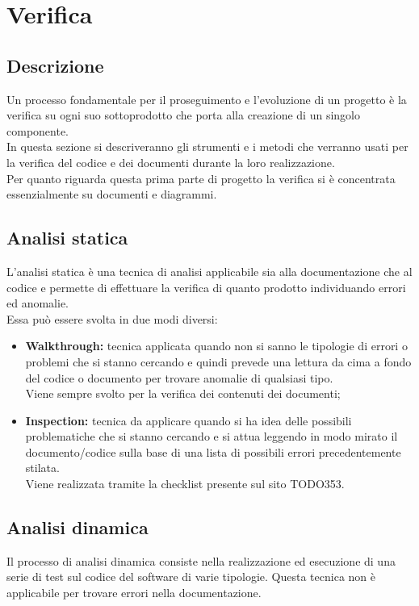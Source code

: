 \documentclass[NormeDiProgetto.tex]{subfiles}
\begin{document}
	\section{Verifica}
	
	\subsection{Descrizione}
	Un processo fondamentale per il proseguimento e l'evoluzione di un progetto è la verifica su ogni suo sottoprodotto che porta alla creazione di un singolo componente.\\
	In questa sezione si descriveranno gli strumenti e i metodi che verranno usati per la verifica del codice e dei documenti durante la loro realizzazione.\\
	Per quanto riguarda questa prima parte di progetto la verifica si è concentrata essenzialmente su documenti e diagrammi.
	
	\subsection{Analisi statica}
	L'analisi statica è una tecnica di analisi applicabile sia alla documentazione che al codice e permette di effettuare la verifica di quanto prodotto individuando errori ed anomalie.\\
	Essa può essere svolta in due modi diversi:
		\begin{itemize}
			\item \textbf{Walkthrough:} tecnica applicata quando non si sanno le tipologie di errori o problemi che si stanno cercando e quindi prevede una lettura da cima a fondo del codice o documento per trovare anomalie di qualsiasi tipo.\\
			Viene sempre svolto per la verifica dei contenuti dei documenti;
						
			\item \textbf{Inspection:} tecnica da applicare quando si ha idea delle possibili problematiche che si stanno cercando e si attua leggendo in modo mirato il documento/codice sulla base di una lista di possibili errori precedentemente stilata.\\
			Viene realizzata tramite la checklist presente sul sito TODO353.
		\end{itemize}
	
	\subsection{Analisi dinamica}
	Il processo di analisi dinamica consiste nella realizzazione ed esecuzione di una serie di test sul codice del software di varie tipologie. Questa tecnica non è applicabile per trovare errori nella documentazione.
	
\end{document}
